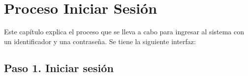 \chapter{Proceso Iniciar Sesión}
	Este capítulo explica el proceso que se lleva a cabo para ingresar al 
	sistema con un identificador y una contraseña. 
	Se tiene la siguiente interfaz:
	


\section{Paso 1. Iniciar sesión}
	
	
